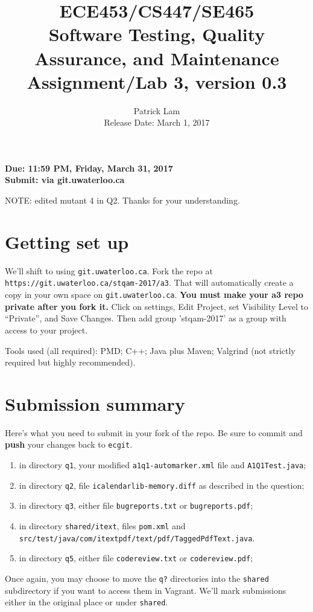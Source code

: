 \documentclass[10pt,hidelinks]{article}
\begin{document}
\title{
ECE453/CS447/SE465 \\
Software Testing, Quality Assurance, and Maintenance\\
Assignment/Lab 3, version 0.3}
\author{Patrick Lam \\
{Release Date: March 1, 2017} \\
}
\renewcommand{\today}{}
\maketitle

\begin{center}

{\bf Due:  11:59 PM, Friday, March 31, 2017} \\
{\bf Submit: via git.uwaterloo.ca }\\
\end{center}

NOTE: edited mutant 4 in Q2. Thanks for your understanding.

\section*{Getting set up}
We'll shift to using {\tt git.uwaterloo.ca}. Fork the repo at 
{\tt https://git.uwaterloo.ca/stqam-2017/a3}. That will automatically create a copy in your own space
on {\tt git.uwaterloo.ca}. {\bf You must make your a3 repo private after you fork it.} Click on settings, Edit Project, set Visibility Level to ``Private'', and Save Changes. Then add group 'stqam-2017' as a group with access to your project.

Tools used (all required): PMD; C++; Java plus Maven; Valgrind (not
strictly required but highly recommended).

\section*{Submission summary}
Here's what you need to submit in your fork of the repo. Be sure to commit
and {\bf push} your changes back to {\tt ecgit}.
\begin{enumerate}
\item in directory {\tt q1}, your modified {\tt a1q1-automarker.xml} file and {\tt A1Q1Test.java};
\item in directory {\tt q2}, file {\tt icalendarlib-memory.diff} as described in the question;
\item in directory {\tt q3}, either file {\tt bugreports.txt} or {\tt bugreports.pdf};
\item in directory {\tt shared/itext}, files {\tt pom.xml} and {\tt src/test/java/com/itextpdf/text/pdf/TaggedPdfText.java}.
\item in directory {\tt q5}, either file {\tt codereview.txt} or {\tt codereview.pdf};
\end{enumerate}
Once again, you may choose to move the {\tt q?} directories into the {\tt shared} subdirectory if you want to access them in Vagrant. We'll mark submissions either in the original place or under {\tt shared}.
\end{document}

